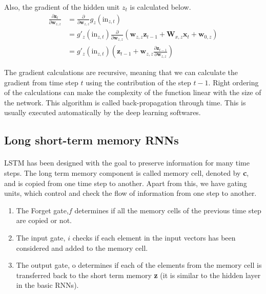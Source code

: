\documentclass{article}
\begin{document}
    Also, the gradient of the hidden unit $z_t$ is calculated below.
    \begin{align*}
      \frac{\partial \mathbf{z}_{t}}{\partial \mathbf{w}_{z,z}} &= \frac{\partial}{\partial \mathbf{w}_{z,z}} g_{z}(\text{in}_{z,t}) \\
      &= g'_{z}(\text{in}_{z,t}) \frac{\partial}{\partial \mathbf{w}_{z,z}} \left( \mathbf{w}_{z,z} \mathbf{z}_{t-1} + \mathbf{W}_{x,z} \mathbf{x}_{t} + \mathbf{w}_{0,z} \right) \\
      &= g'_{z}(\text{in}_{z,t}) \left( \mathbf{z}_{t-1} + \mathbf{w}_{z,z} \frac{\partial \mathbf{z}_{t-1}}{\partial \mathbf{w}_{z,z}} \right) \tag{22.15}
    \end{align*}

    The gradient calculations are recursive, meaning that we can calculate the gradient from time step $t$ using the contribution of the step $t-1$. Right ordering of the calculations can make the complexity of the function linear with the size of the network. This algorithm is called back-propagation through time. This is usually executed automatically by the deep learning softwares.

  \subsection{Long short-term memory RNNs}
  \paragraph{} LSTM has been designed with the goal to preserve information for many time steps. The long term memory component is called memory cell, denoted by \textbf{c}, and is copied from one time step to another. Apart from this, we have gating units, which control and check the flow of information from one step to another.
    \begin{enumerate}
      \item The Forget gate,$f$  determines if all the memory cells of the previous time step are copied or not.
      \item The input gate, $i$ checks if each element in the input vectors has been considered and added to the memory cell.
      \item The output gate, o determines if each of the elements from the memory cell is transferred back to the short term memory \textbf{z} (it is similar to the hidden layer in the basic RNNs).
    \end{enumerate}
\end{document}
